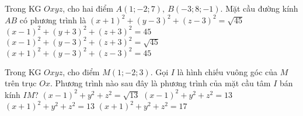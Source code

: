 \begin{ex}%
	Trong KG $Oxyz$, cho hai điểm $A(1;-2;7),\ B(-3;8;-1)$. Mặt cầu đường kính $AB$ có phương trình là
	\choice
	{$(x+1)^2+(y-3)^2+(z-3)^2=\sqrt{45}$}
	{$(x-1)^2+(y+3)^2+(z+3)^2=45$}
	{$(x-1)^2+(y-3)^2+(z+3)^2=\sqrt{45}$}
	{\True $(x+1)^2+(y-3)^2+(z-3)^2=45$}
\end{ex}
\begin{ex}%
	Trong KG $Oxyz$, cho điểm $M(1;-2;3)$. Gọi $I$ là hình chiếu vuông góc của $M$ trên trục $Ox$. Phương trình nào sau đây là phương trình của mặt cầu tâm $I$ bán kính $IM$?
	\choice
	{$(x-1)^2+y^2+z^2=\sqrt{13}$}
	{\True $(x-1)^2+y^2+z^2=13$}
	{$(x+1)^2+y^2+z^2=13$}
	{$(x+1)^2+y^2+z^2=17$}
\end{ex}

